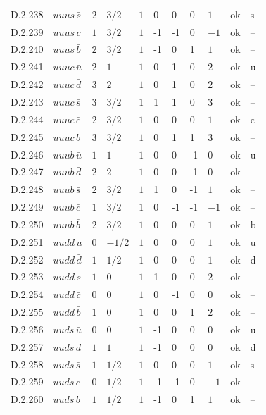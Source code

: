 {\begin{longtable}{@{}llllllllll>{\raggedright\arraybackslash}p{2.0cm}@{}}
D.2.238 & $uuus\,\bar{s}$ & $2$ & $3/2$ & $1$ & 0 & 0 & 0 & $1$ & ok & s \\
D.2.239 & $uuus\,\bar{c}$ & $1$ & $3/2$ & $1$ & -1 & -1 & 0 & $-1$ & ok & -- \\
D.2.240 & $uuus\,\bar{b}$ & $2$ & $3/2$ & $1$ & -1 & 0 & 1 & $1$ & ok & -- \\
D.2.241 & $uuuc\,\bar{u}$ & $2$ & $1$ & $1$ & 0 & 1 & 0 & $2$ & ok & u \\
D.2.242 & $uuuc\,\bar{d}$ & $3$ & $2$ & $1$ & 0 & 1 & 0 & $2$ & ok & -- \\
D.2.243 & $uuuc\,\bar{s}$ & $3$ & $3/2$ & $1$ & 1 & 1 & 0 & $3$ & ok & -- \\
D.2.244 & $uuuc\,\bar{c}$ & $2$ & $3/2$ & $1$ & 0 & 0 & 0 & $1$ & ok & c \\
D.2.245 & $uuuc\,\bar{b}$ & $3$ & $3/2$ & $1$ & 0 & 1 & 1 & $3$ & ok & -- \\
D.2.246 & $uuub\,\bar{u}$ & $1$ & $1$ & $1$ & 0 & 0 & -1 & $0$ & ok & u \\
D.2.247 & $uuub\,\bar{d}$ & $2$ & $2$ & $1$ & 0 & 0 & -1 & $0$ & ok & -- \\
D.2.248 & $uuub\,\bar{s}$ & $2$ & $3/2$ & $1$ & 1 & 0 & -1 & $1$ & ok & -- \\
D.2.249 & $uuub\,\bar{c}$ & $1$ & $3/2$ & $1$ & 0 & -1 & -1 & $-1$ & ok & -- \\
D.2.250 & $uuub\,\bar{b}$ & $2$ & $3/2$ & $1$ & 0 & 0 & 0 & $1$ & ok & b \\
D.2.251 & $uudd\,\bar{u}$ & $0$ & $-1/2$ & $1$ & 0 & 0 & 0 & $1$ & ok & u \\
D.2.252 & $uudd\,\bar{d}$ & $1$ & $1/2$ & $1$ & 0 & 0 & 0 & $1$ & ok & d \\
D.2.253 & $uudd\,\bar{s}$ & $1$ & $0$ & $1$ & 1 & 0 & 0 & $2$ & ok & -- \\
D.2.254 & $uudd\,\bar{c}$ & $0$ & $0$ & $1$ & 0 & -1 & 0 & $0$ & ok & -- \\
D.2.255 & $uudd\,\bar{b}$ & $1$ & $0$ & $1$ & 0 & 0 & 1 & $2$ & ok & -- \\
D.2.256 & $uuds\,\bar{u}$ & $0$ & $0$ & $1$ & -1 & 0 & 0 & $0$ & ok & u \\
D.2.257 & $uuds\,\bar{d}$ & $1$ & $1$ & $1$ & -1 & 0 & 0 & $0$ & ok & d \\
D.2.258 & $uuds\,\bar{s}$ & $1$ & $1/2$ & $1$ & 0 & 0 & 0 & $1$ & ok & s \\
D.2.259 & $uuds\,\bar{c}$ & $0$ & $1/2$ & $1$ & -1 & -1 & 0 & $-1$ & ok & -- \\
D.2.260 & $uuds\,\bar{b}$ & $1$ & $1/2$ & $1$ & -1 & 0 & 1 & $1$ & ok & -- \\

\end{longtable}}
